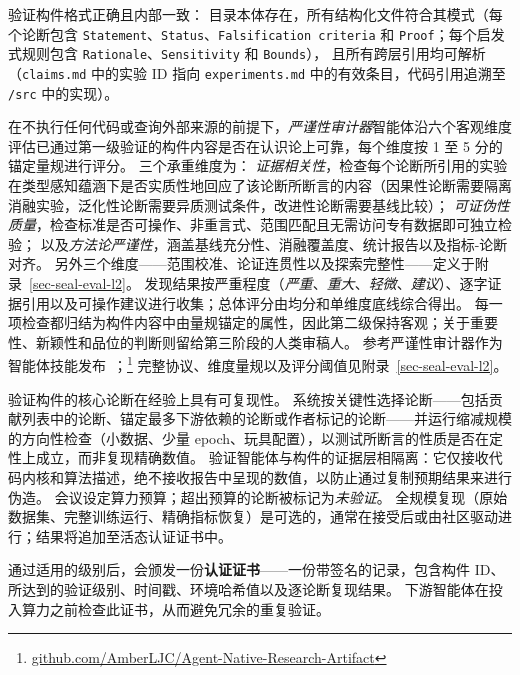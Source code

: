 \begin{description}[leftmargin=1.5em, itemsep=4pt, topsep=2pt]
    \item[Level 1 -- 结构完整性]
    验证构件格式正确且内部一致：
    目录本体存在，所有结构化文件符合其模式（每个论断包含 \texttt{Statement}、\texttt{Status}、\texttt{Falsification criteria} 和 \texttt{Proof}；每个启发式规则包含 \texttt{Rationale}、\texttt{Sensitivity} 和 \texttt{Bounds}），
    且所有跨层引用均可解析（\texttt{claims.md} 中的实验 ID 指向 \texttt{experiments.md} 中的有效条目，代码引用追溯至 \texttt{/src} 中的实现）。


    \item[Level 2 -- 论证严谨性]
    在不执行任何代码或查询外部来源的前提下，\emph{严谨性审计器}智能体沿六个客观维度评估已通过第一级验证的构件内容是否在认识论上可靠，每个维度按 1 至 5 分的锚定量规进行评分。
    三个承重维度为：
    \emph{证据相关性}，检查每个论断所引用的实验在类型感知蕴涵下是否实质性地回应了该论断所断言的内容（因果性论断需要隔离消融实验，泛化性论断需要异质测试条件，改进性论断需要基线比较）；
    \emph{可证伪性质量}，检查标准是否可操作、非重言式、范围匹配且无需访问专有数据即可独立检验；
    以及\emph{方法论严谨性}，涵盖基线充分性、消融覆盖度、统计报告以及指标-论断对齐。
    另外三个维度——范围校准、论证连贯性以及探索完整性——定义于附录~\ref{sec-seal-eval-l2}。
    发现结果按严重程度（\emph{严重}、\emph{重大}、\emph{轻微}、\emph{建议}）、逐字证据引用以及可操作建议进行收集；总体评分由均分和单维度底线综合得出。
    每一项检查都归结为构件内容中由量规锚定的属性，因此第二级保持客观；关于重要性、新颖性和品位的判断则留给第三阶段的人类审稿人。
    参考严谨性审计器作为智能体技能发布~\citep{agentskills2025}；\footnote{\url{github.com/AmberLJC/Agent-Native-Research-Artifact}} 完整协议、维度量规以及评分阈值见附录~\ref{sec-seal-eval-l2}。

    \item[Level 3 -- 执行可复现性]
    验证构件的核心论断在经验上具有可复现性。
    系统按关键性选择论断——包括贡献列表中的论断、锚定最多下游依赖的论断或作者标记的论断——并运行缩减规模的方向性检查（小数据、少量 epoch、玩具配置），以测试所断言的性质是否在定性上成立，而非复现精确数值。
    验证智能体与构件的证据层相隔离：它仅接收代码内核和算法描述，绝不接收报告中呈现的数值，以防止通过复制预期结果来进行伪造。
    会议设定算力预算；超出预算的论断被标记为\emph{未验证}。
    全规模复现（原始数据集、完整训练运行、精确指标恢复）是可选的，通常在接受后或由社区驱动进行；结果将追加至活态认证证书中。
\end{description}

通过适用的级别后，会颁发一份\textbf{认证证书}——一份带签名的记录，包含构件 ID、所达到的验证级别、时间戳、环境哈希值以及逐论断复现结果。
下游智能体在投入算力之前检查此证书，从而避免冗余的重复验证。


